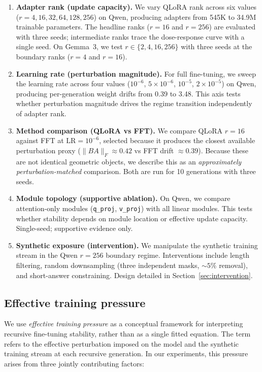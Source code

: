 \documentclass[a4paper,fleqn]{cas-dc}
\begin{document}
\begin{enumerate}
\item \textbf{Adapter rank (update capacity).} We vary QLoRA rank across six
values ($r=4,16,32,64,128,256$) on Qwen, producing adapters from 545K to 34.9M
trainable parameters. The headline ranks ($r=16$ and $r=256$) are evaluated with
three seeds; intermediate ranks trace the dose-response curve with a single
seed. On Gemma~3, we test $r \in \{2,4,16,256\}$ with three seeds at the
boundary ranks ($r=4$ and $r=16$).

\item \textbf{Learning rate (perturbation magnitude).} For full fine-tuning, we
sweep the learning rate across four values ($10^{-6}$, $5{\times}10^{-6}$,
$10^{-5}$, $2{\times}10^{-5}$) on Qwen, producing per-generation weight drifts
from 0.39 to 3.48. This axis tests whether perturbation magnitude drives the
regime transition independently of adapter rank.

\item \textbf{Method comparison (QLoRA vs FFT).} We compare QLoRA $r=16$
against FFT at $\mathrm{LR}=10^{-6}$, selected because it produces the closest
available perturbation proxy ($\|BA\|_F \approx 0.42$ vs FFT drift $\approx
0.39$). Because these are not identical geometric objects, we describe this as
an \textit{approximately perturbation-matched} comparison. Both are run for 10
generations with three seeds.

\item \textbf{Module topology (supportive ablation).} On Qwen, we compare
attention-only modules (\texttt{q\_proj}, \texttt{v\_proj}) with all linear
modules. This tests whether stability depends on module location or effective
update capacity. Single-seed; supportive evidence only.

\item \textbf{Synthetic exposure (intervention).} We manipulate the synthetic
training stream in the Qwen $r=256$ boundary regime. Interventions include
length filtering, random downsampling (three independent masks, ${\sim}5\%$
removal), and short-answer constraining. Design detailed in
Section~\ref{sec:intervention}.
\end{enumerate}

\subsection{Effective training pressure}\label{sec:pressure}

We use \textit{effective training pressure} as a conceptual framework for
interpreting recursive fine-tuning stability, rather than as a single fitted
equation. The term refers to the effective perturbation imposed on the model and
the synthetic training stream at each recursive generation. In our experiments,
this pressure arises from three jointly contributing factors:
\end{document}
